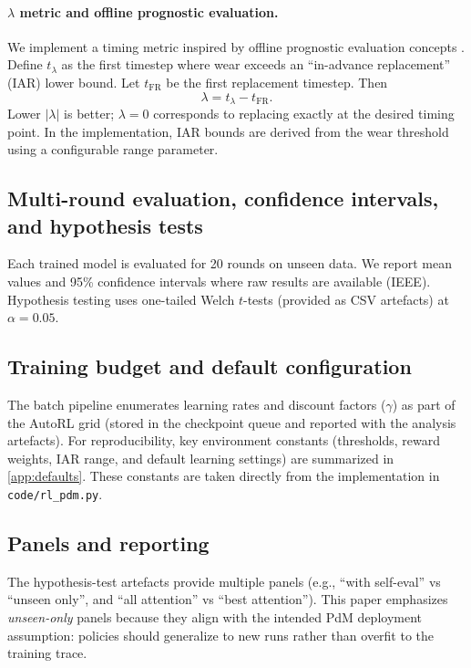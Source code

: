 \documentclass[11pt]{article}
\begin{document}
\paragraph{$\lambda$ metric and offline prognostic evaluation.}
We implement a timing metric inspired by offline prognostic evaluation concepts \parencite{Saxena2008Metrics}. Define $t_{\lambda}$ as the first timestep where wear exceeds an ``in-advance replacement'' (IAR) lower bound. Let $t_{\mathrm{FR}}$ be the first replacement timestep. Then
\begin{equation}
	\lambda = t_{\lambda} - t_{\mathrm{FR}}.
\end{equation}
Lower $|\lambda|$ is better; $\lambda=0$ corresponds to replacing exactly at the desired timing point. In the implementation, IAR bounds are derived from the wear threshold using a configurable range parameter.

\subsection{Multi-round evaluation, confidence intervals, and hypothesis tests}
Each trained model is evaluated for 20 rounds on unseen data. We report mean values and 95\% confidence intervals where raw results are available (IEEE). Hypothesis testing uses one-tailed Welch $t$-tests (provided as CSV artefacts) at $\alpha=0.05$.

\subsection{Training budget and default configuration}
The batch pipeline enumerates learning rates and discount factors ($\gamma$) as part of the AutoRL grid (stored in the checkpoint queue and reported with the analysis artefacts). For reproducibility, key environment constants (thresholds, reward weights, IAR range, and default learning settings) are summarized in \cref{app:defaults}. These constants are taken directly from the implementation in \texttt{code/rl\_pdm.py}.

\subsection{Panels and reporting}
The hypothesis-test artefacts provide multiple panels (e.g., ``with self-eval'' vs ``unseen only'', and ``all attention'' vs ``best attention''). This paper emphasizes \emph{unseen-only} panels because they align with the intended PdM deployment assumption: policies should generalize to new runs rather than overfit to the training trace.
\end{document}
